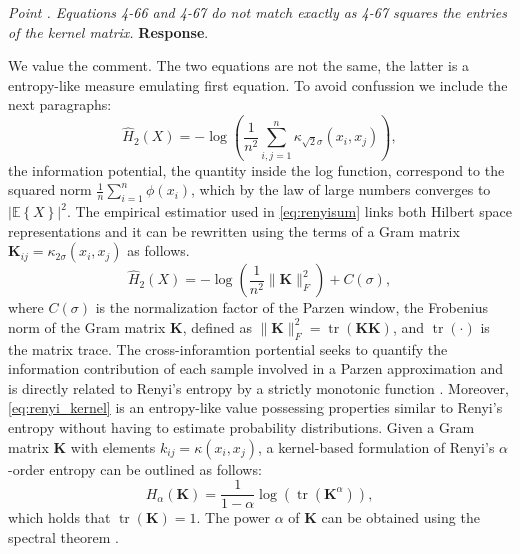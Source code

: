 \documentclass[runningheads]{llncs}
\newcommand{\mat}[1]{\bm {#1}}
\newenvironment{reviewer}{\setcounter{pointcounter}{1}}{}
\newcommand{\changes}[1]{\textcolor[rgb]{1.00,0.00,0.00}{#1}}
\newcommand{\point}[1]{\medskip \noindent
  \textsl{{\fontseries{b}\selectfont Point \thepointcounter}.
\stepcounter{pointcounter} #1}}
\newcommand{\reply}{\medskip \noindent \textbf{Response}.\ }
\begin{document}
\begin{reviewer}
  \point{Equations 4-66 and 4-67 do not match exactly as 4-67 squares
  the entries of the kernel matrix.}
  \reply{
    We value the comment. The two equations are not the same, the
    latter is a entropy-like measure emulating first equation. To
    avoid confussion we include the next paragraphs:
    \changes{
      \begin{equation}\label{eq:renyisum}
        \hat{H}_{2}(X)=-\log \left(\frac{1}{n^{2}} \sum_{i, j=1}^{n}
        \kappa_{\sqrt{2}\sigma}\left(x_{i}, x_{j}\right)\right),
      \end{equation}
      the information potential, the quantity inside the log
      function, correspond to the squared norm $\frac{1}{n}
      \sum_{i=1}^{n} \phi(x_{i})$, which by the law of large numbers
      converges to $\left|\mathbb{E}\left\{ X \right\}\right|^{2}$.
      The empirical estimatior used in \cref{eq:renyisum} links both
      Hilbert space representations and it can be rewritten using the
      terms of a Gram matrix $\mat{K}_{ij} =
      \kappa_{2\sigma}\left(x_{i}, x_{j}\right)$ as follows.
      \begin{equation}\label{eq:renyi_kernel}
        \hat{H}_{2}(X)=-\log \left(\frac{1}{n^{2}}
        \|\mat{K}\|_{F}^{2}\right)+C(\sigma),
      \end{equation}
      where $C(\sigma)$ is the normalization factor of the Parzen
      window, the Frobenius norm of the Gram matrix $\mat{K}$,
      defined as $\|\mat{K}\|_{F}^{2}=\operatorname{tr}(\mat{K K})$,
      and $\operatorname{tr}(\cdot)$ is the matrix trace.
    }
    \changes{The cross-inforamtion portential seeks to quantify the
      information contribution of each sample involved in a Parzen
      approximation and is directly related to Renyi's entropy by a
      strictly monotonic function \cite{giraldo2014measures}. Moreover,
      \cref{eq:renyi_kernel} is an entropy-like value possessing
      properties similar to Renyi's entropy without having to estimate
      probability distributions. Given a Gram matrix $\mat{K}$ with
      elements $k_{i j} = \kappa\left(x_{i}, x_{j}\right)$, a
      kernel-based formulation of Renyi's $\alpha$-order entropy can be
    outlined as follows:}
    \begin{equation}
      H_{\alpha}(\mat{K})=\frac{1}{1-\alpha} \log
      \left(\operatorname{tr}\left(\mat{K}^{\alpha}\right)\right),
    \end{equation}
    which holds that $\operatorname{tr}(\mat{K})=1$. The power
    $\alpha$ of $\mat{K}$ can be obtained using the spectral theorem
    \cite{giraldo2014measures}.

}
\end{reviewer}
\end{document}
